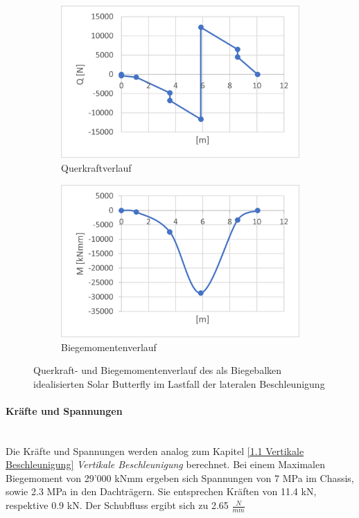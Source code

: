   \begin{figure}[!ht]
    \centering
      \begin{subfigure}{.5\textwidth}
        \centering
        \includegraphics[width=.98\linewidth]{04_figures/1.4 Q.png}
        \caption{Querkraftverlauf}
        \label{1.4 Q}
      \end{subfigure}%
      \begin{subfigure}{.5\textwidth}
        \centering
        \includegraphics[width=.98\linewidth]{04_figures/1.4 M.png}
        \caption{Biegemomentenverlauf}
        \label{1.4 M}
      \end{subfigure}%
    \caption{Querkraft- und Biegemomentenverlauf des als Biegebalken idealisierten Solar Butterfly im Lastfall der lateralen Beschleunigung}
  \label{1.4 QM}
  \end{figure}

  \paragraph{Kräfte und Spannungen}\mbox{}\\
  Die Kräfte und Spannungen werden analog zum Kapitel \ref{1.1 Vertikale Beschleunigung} \emph{Vertikale Beschleunigung} berechnet. Bei einem Maximalen Biegemoment von 29'000 kNmm ergeben sich Spannungen von 7 MPa im Chassis, sowie 2.3 MPa in den Dachträgern. Sie entsprechen Kräften von 11.4 kN, respektive 0.9 kN. Der Schubfluss ergibt sich zu 2.65 $\frac{N}{mm}$

